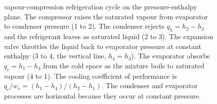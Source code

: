 \begin{figure}[htbp]
{vapour-compression refrigeration cycle on the pressure-enthalpy plane. The
compressor raises the saturated vapour from evaporator to condenser pressure
(1 to 2). The condenser rejects $q_h = h_2 - h_3$ and the refrigerant leaves as
saturated liquid (2 to 3). The expansion valve throttles the liquid back to
evaporator pressure at constant enthalpy (3 to 4, the vertical line, $h_4 =
h_3$). The evaporator absorbs $q_c = h_1 - h_4$ from the cold space as the
mixture boils to saturated vapour (4 to 1). The cooling coefficient of
performance is $q_c/w_c = (h_1 - h_4)/(h_2 - h_1)$. The condenser and
evaporator processes are horizontal because they occur at constant pressure.}
\label{fig:vol04ch03:vapor-compression-ph}
\end{figure}
